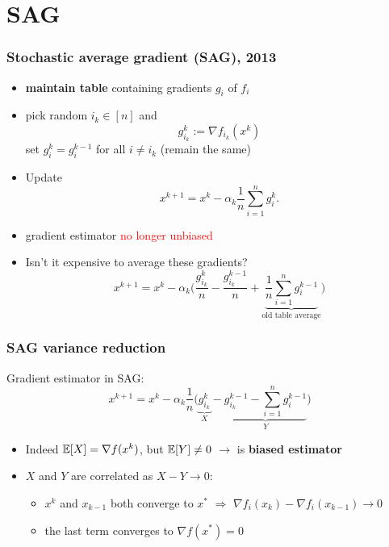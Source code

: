 \documentclass[aspectratio=149]{beamer}
\begin{document}
\section{SAG}%
\label{sec:}

\begin{frame}
  \frametitle{Stochastic average gradient (SAG), 2013}
  \begin{itemize}
    \item \textbf{maintain table} containing gradients $g_i$ of $f_i$
    \item pick random $i_k \in [n]$ and
          \begin{equation}
            g_{i_k}^k := \nabla f_{i_k}(x^{k})
          \end{equation}
          set $g_{i}^k = g_i^{k-1}$ for all $i\neq i_k$ (remain the same)
    \item Update
          \begin{equation}
            x^{k+1} = x^k - \alpha_k \frac{1}{n} \sum_{i=1}^{n} g_i^k.
          \end{equation}
    \item gradient estimator \textcolor{red}{no longer unbiased}
    \item Isn't it expensive to average these gradients?
          \begin{equation}
            x^{k+1} = x^k - \alpha_k  \Big( \frac{g_{i_k}^k}{n} - \frac{g_{i_k}^{k-1}}{n} + \underbrace{\frac{1}{n}\sum_{i=1}^{n} g_i^{k-1}}_{\text{old table average}} \Big)
          \end{equation}
  \end{itemize}
\end{frame}


\begin{frame}
  \frametitle{SAG variance reduction}
  Gradient estimator in SAG:
  \begin{equation}
    x^{k+1} = x^k - \alpha_k \frac{1}{n} \Big( \underbrace{g_{i_k}^k}_X - \underbrace{g_{i_k}^{k-1} - \sum_{i=1}^{n} g_i^{k-1}}_{Y} \Big)
  \end{equation}
  \begin{itemize}
    \item Indeed $\mathbb{E}[X] = \nabla f(x^k)$, but $\mathbb{E}[Y]\neq 0$ $\rightarrow $ is \textbf{biased estimator}
    \item $X$ and $Y$ are correlated as $X-Y \to 0$:
          \begin{itemize}
            \item $x^k$ and $x_{k-1}$ both converge to $x^*$ $\Rightarrow$ $ \nabla f_i(x_k) - \nabla f_i(x_{k-1}) \to 0$
            \item the last term converges to $\nabla f(x^*)= 0$
          \end{itemize}
  \end{itemize}
\end{frame}
\end{document}
